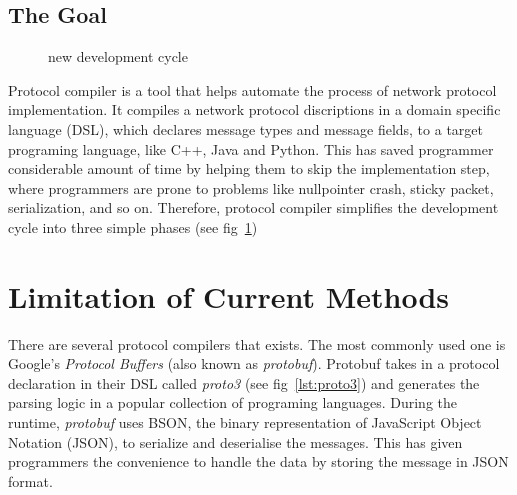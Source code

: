 \documentclass{article}
\begin{document}
\subsection{The Goal}

\begin{figure}[h!]
\begin{center}
\label{fig:newDevelopmentCycle}
\caption{new development cycle}
\end{center}
\end{figure}

Protocol compiler is a tool that helps automate the process of network protocol implementation. It compiles a network protocol discriptions in a domain specific language (DSL), which declares message types and message fields, to a target programing language, like C++, Java and Python. This has saved programmer considerable amount of time by helping them to skip the implementation step, where programmers are prone to problems like nullpointer crash, sticky packet, serialization, and so on. Therefore, protocol compiler simplifies the development cycle into three simple phases (see fig~\ref{fig:newDevelopmentCycle})




\section{Limitation of Current Methods}

There are several protocol compilers that exists. The most commonly used one is Google's \textit{Protocol Buffers} (also known as \textit{protobuf}). Protobuf takes in a protocol declaration in their DSL called \textit{proto3} (see fig~\ref{lst:proto3}) and generates the parsing logic in a popular collection of programing languages. During the runtime, \textit{protobuf} uses BSON, the binary representation of JavaScript Object Notation (JSON), to serialize and deserialise the messages. This has given programmers the convenience to handle the data by storing the message in JSON format.\\
\end{document}
